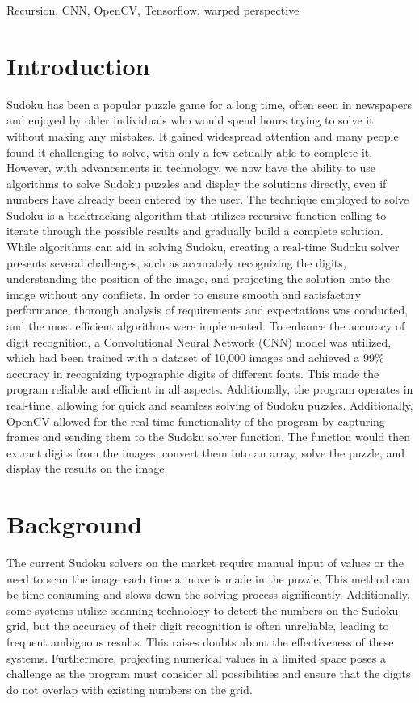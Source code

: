 \documentclass[conference]{IEEEtran}
\begin{document}
\begin{IEEEkeywords}
Recursion, CNN, OpenCV, Tensorflow, warped perspective
\end{IEEEkeywords}

\section{Introduction}
Sudoku has been a popular puzzle game for a long time, often seen in newspapers and enjoyed by older individuals who would spend hours trying to solve it without making any mistakes. It gained widespread attention and many people found it challenging to solve, with only a few actually able to complete it. However, with advancements in technology, we now have the ability to use algorithms to solve Sudoku puzzles and display the solutions directly, even if numbers have already been entered by the user. The technique employed to solve Sudoku is a backtracking algorithm that utilizes recursive function calling to iterate through the possible results and gradually build a complete solution. While algorithms can aid in solving Sudoku, creating a real-time Sudoku solver presents several challenges, such as accurately recognizing the digits, understanding the position of the image, and projecting the solution onto the image without any conflicts. In order to ensure smooth and satisfactory performance, thorough analysis of requirements and expectations was conducted, and the most efficient algorithms were implemented. To enhance the accuracy of digit recognition, a Convolutional Neural Network (CNN) model was utilized, which had been trained with a dataset of 10,000 images and achieved a 99\% accuracy in recognizing typographic digits of different fonts. This made the program reliable and efficient in all aspects. Additionally, the program operates in real-time, allowing for quick and seamless solving of Sudoku puzzles. Additionally, OpenCV allowed for the real-time functionality of the program by capturing frames and sending them to the Sudoku solver function. The function would then extract digits from the images, convert them into an array, solve the puzzle, and display the results on the image.


\section{Background}
The current Sudoku solvers on the market require manual input of values or the need to scan the image each time a move is made in the puzzle. This method can be time-consuming and slows down the solving process significantly. Additionally, some systems utilize scanning technology to detect the numbers on the Sudoku grid, but the accuracy of their digit recognition is often unreliable, leading to frequent ambiguous results. This raises doubts about the effectiveness of these systems. Furthermore, projecting numerical values in a limited space poses a challenge as the program must consider all possibilities and ensure that the digits do not overlap with existing numbers on the grid.
\end{document}
